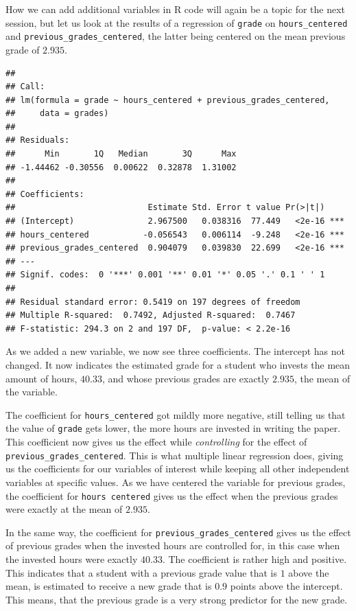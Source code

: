 \documentclass[
]{book}
\begin{document}
How we can add additional variables in R code will again be a topic for the next
session, but let us look at the results of a regression of \texttt{grade} on
\texttt{hours\_centered} and \texttt{previous\_grades\_centered}, the latter being centered on the
mean previous grade of \(2.935\).

\begin{verbatim}
## 
## Call:
## lm(formula = grade ~ hours_centered + previous_grades_centered, 
##     data = grades)
## 
## Residuals:
##      Min       1Q   Median       3Q      Max 
## -1.44462 -0.30556  0.00622  0.32878  1.31002 
## 
## Coefficients:
##                           Estimate Std. Error t value Pr(>|t|)    
## (Intercept)               2.967500   0.038316  77.449   <2e-16 ***
## hours_centered           -0.056543   0.006114  -9.248   <2e-16 ***
## previous_grades_centered  0.904079   0.039830  22.699   <2e-16 ***
## ---
## Signif. codes:  0 '***' 0.001 '**' 0.01 '*' 0.05 '.' 0.1 ' ' 1
## 
## Residual standard error: 0.5419 on 197 degrees of freedom
## Multiple R-squared:  0.7492, Adjusted R-squared:  0.7467 
## F-statistic: 294.3 on 2 and 197 DF,  p-value: < 2.2e-16
\end{verbatim}

As we added a new variable, we now see three coefficients.
The intercept has not changed. It now indicates the estimated grade for a
student who invests the mean amount of hours, \(40.33\), and whose previous grades
are exactly \(2.935\), the mean of the variable.

The coefficient for \texttt{hours\_centered} got mildly more negative, still telling us
that the value of \texttt{grade} gets lower, the more hours are invested in writing the
paper. This coefficient now gives us the effect while \emph{controlling} for the
effect of \texttt{previous\_grades\_centered}. This is what multiple linear regression
does, giving us the coefficients for our variables of interest while keeping all
other independent variables at specific values. As we have centered the variable
for previous grades, the coefficient for \texttt{hours\ centered} gives us the effect
when the previous grades were exactly at the mean of \(2.935\).

In the same way, the coefficient for \texttt{previous\_grades\_centered} gives us the
effect of previous grades when the invested hours are controlled for, in this
case when the invested hours were exactly \(40.33\). The coefficient is rather
high and positive. This indicates that a student with a previous grade value
that is \(1\) above the mean, is estimated to receive a new grade that is \(0.9\)
points above the intercept. This means, that the previous grade is a very strong
predictor for the new grade.
\end{document}
